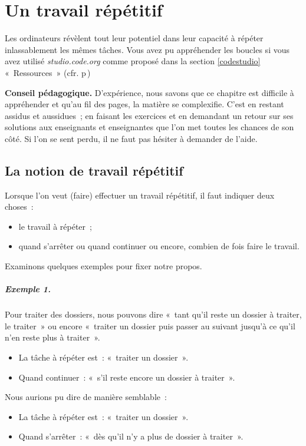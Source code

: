 \chapter{Un travail répétitif}
\label{chap:bcl}

	Les ordinateurs révèlent tout leur potentiel dans leur capacité à répéter
	inlassablement les mêmes tâches.  Vous avez pu appréhender les boucles si
	vous avez utilisé \textit{studio.code.org} comme proposé dans la section
	\ref{codestudio} «~Ressources~» (cfr. p\,\pageref{codestudio})

	\textbf{Conseil pédagogique.} 
	D’expérience, nous savons que ce chapitre est difficile à appréhender et
	qu'au fil des pages, la matière se complexifie.  C'est en restant assidus et
	aussidues~; en faisant les exercices et en demandant un retour sur ses
	solutions aux enseignants et enseignantes que l'on met toutes les chances de
	son côté. Si l'on se sent perdu, il ne faut pas hésiter à demander de
	l'aide. 

	\minitoc

\section{La notion de travail répétitif}

	Lorsque l'on veut (faire) effectuer un travail répétitif, 
	il faut indiquer deux choses~:
	\begin{itemize}
	\item le travail à répéter~;
	\item quand s’arrêter ou quand continuer ou encore,  combien de fois faire 
		le travail.
	\end{itemize}

	Examinons quelques exemples pour fixer notre propos.

	\paragraph{Exemple 1.} 
	Pour traiter des dossiers, nous pouvons dire 
	«~tant qu’il reste un dossier à traiter, le traiter~» 
	ou encore 
	«~traiter un dossier puis passer au suivant jusqu’à ce qu’il n’en 
	reste plus à traiter~».
	\begin{itemize}
	\item La tâche à répéter est~: «~traiter un dossier~».
	\item Quand continuer~: «~s’il reste encore un dossier à traiter~».
	\end{itemize}
	Nous aurions pu dire de manière semblable~:
	\begin{itemize}
	\item La tâche à répéter est~: «~traiter un dossier~».
	\item Quand s'arrêter~: «~dès qu'il n'y a plus de dossier à traiter~».
	\end{itemize}

